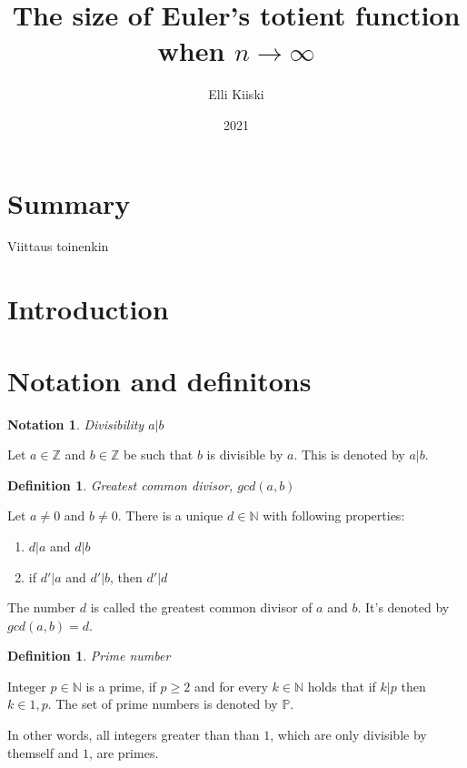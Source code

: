 \documentclass{article}
\title{The size of Euler's totient function when $n \rightarrow \infty$}
\author{Elli Kiiski}
\date{2021}
\theoremstyle{definition}
\newtheorem{definition}[subsection]{Definition}
\newtheorem{notation}[subsection]{Notation}
\begin{document}
\maketitle

\newpage

\section{Summary}

Viittaus \cite{HardyWright} toinenkin \cite{Saksman}

\section{Introduction}

\section{Notation and definitons}

\begin{notation}{\emph{Divisibility $a \vert b$}}

Let $a \in \mathbb{Z}$ and $b \in \mathbb{Z}$ be such that $b$ is divisible by $a$. This is denoted by $a \vert b$.

\end{notation}

\begin{definition}{\emph{Greatest common divisor, $gcd(a, b)$}}

Let $a \not= 0$ and $b \not= 0$. There is a unique $d \in \mathbb{N}$ with following properties:

\begin{enumerate}
 \item $d \vert a$ and $d \vert b$
 \item if $d' \vert a$ and $d' \vert b$, then $d' \vert d$
\end{enumerate}

The number $d$ is called the greatest common divisor of $a$ and $b$. It's denoted by $gcd(a,b) = d$.

\end{definition}

\begin{definition}{\emph{Prime number}}

Integer $p\in\mathbb{N}$ is a prime, if $p \geq 2$ and for every $k\in\mathbb{N}$ holds that if $k \vert p$ then $k\in{1, p}$. The set of prime numbers is denoted by $\mathbb{P}$.

In other words, all integers greater than than $1$, which are only divisible by themself and $1$, are primes.


\end{definition}
\end{document}
